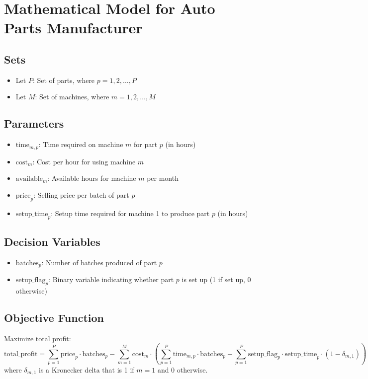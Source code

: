 \documentclass{article}
\begin{document}
\section*{Mathematical Model for Auto Parts Manufacturer}

\subsection*{Sets}
\begin{itemize}
    \item Let \( P \): Set of parts, where \( p = 1, 2, \ldots, P \)
    \item Let \( M \): Set of machines, where \( m = 1, 2, \ldots, M \)
\end{itemize}

\subsection*{Parameters}
\begin{itemize}
    \item \( \text{time}_{m,p} \): Time required on machine \( m \) for part \( p \) (in hours)
    \item \( \text{cost}_{m} \): Cost per hour for using machine \( m \)
    \item \( \text{available}_{m} \): Available hours for machine \( m \) per month
    \item \( \text{price}_{p} \): Selling price per batch of part \( p \)
    \item \( \text{setup\_time}_{p} \): Setup time required for machine 1 to produce part \( p \) (in hours)
\end{itemize}

\subsection*{Decision Variables}
\begin{itemize}
    \item \( \text{batches}_{p} \): Number of batches produced of part \( p \)
    \item \( \text{setup\_flag}_{p} \): Binary variable indicating whether part \( p \) is set up (1 if set up, 0 otherwise)
\end{itemize}

\subsection*{Objective Function}
Maximize total profit:
\[
\text{total\_profit} = \sum_{p=1}^{P} \text{price}_{p} \cdot \text{batches}_{p} - \sum_{m=1}^{M} \text{cost}_{m} \cdot \left( \sum_{p=1}^{P} \text{time}_{m,p} \cdot \text{batches}_{p} + \sum_{p=1}^{P} \text{setup\_flag}_{p} \cdot \text{setup\_time}_{p} \cdot (1 - \delta_{m,1}) \right)
\]
where \( \delta_{m,1} \) is a Kronecker delta that is 1 if \( m=1 \) and 0 otherwise.
\end{document}
